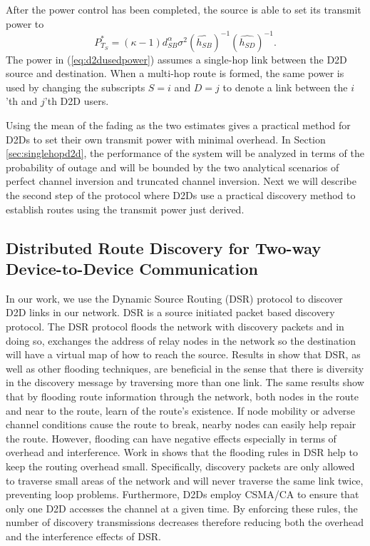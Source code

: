 \documentclass[10pt, final, journal, letterpaper,oneside, twocolumn]{IEEEtran}
\begin{document}
After the power control has been completed, the source is able to set its transmit power to 
\begin{equation}
P_{T_{S}}^{*} = (\kappa-1)d_{SB}^{\alpha}\sigma^2(\widehat{h_{SB}})^{-1}(\widehat{h_{SD}})^{-1}.
\label{eq:d2dusedpower}
\end{equation}  
The power in (\ref{eq:d2dusedpower}) assumes a single-hop link between the D2D source and destination.  When a multi-hop route is formed, the same power is used by changing the subscripts $S = i$ and $D = j$ to denote a link between the $i$'th and $j$'th D2D users.  

Using the mean of the fading as the two estimates gives a practical method for D2Ds to set their own transmit power with minimal overhead.  In Section \ref{sec:singlehopd2d}, the performance of the system will be analyzed in terms of the probability of outage and will be bounded by the two analytical scenarios of perfect channel inversion and truncated channel inversion.  Next we will describe the second step of the protocol where D2Ds use a practical discovery method to establish routes using the transmit power just derived.  



\subsection{Distributed Route Discovery for Two-way Device-to-Device Communication}  
\label{sec:discover_protocol}
In our work, we use the Dynamic Source Routing (DSR) protocol\cite{dsr_original} to discover D2D links in our network.  DSR is a source initiated packet based discovery protocol.  The DSR protocol floods the network with discovery packets and in doing so, exchanges the address of relay nodes in the network so the destination will have a virtual map of how to reach the source.  Results in \cite{flood_routing_loh,flood_jun} show that DSR, as well as other flooding techniques, are beneficial in the sense that there is diversity in the discovery message by traversing more than one link.  The same results show that by flooding route information through the network, both nodes in the route and near to the route, learn of the route's existence.  If node mobility or adverse channel conditions cause the route to break, nearby nodes can easily help repair the route.  However, flooding can have negative effects especially in terms of overhead and interference.  Work in \cite{dsr3} shows that the flooding rules in DSR help to keep the routing overhead small.  Specifically, discovery packets are only allowed to traverse small areas of the network and will never traverse the same link twice, preventing loop problems.  Furthermore, D2Ds employ CSMA/CA to ensure that only one D2D accesses the channel at a given time.  By enforcing these rules, the number of discovery transmissions decreases therefore reducing both the overhead and the interference effects of DSR.  
\end{document}
